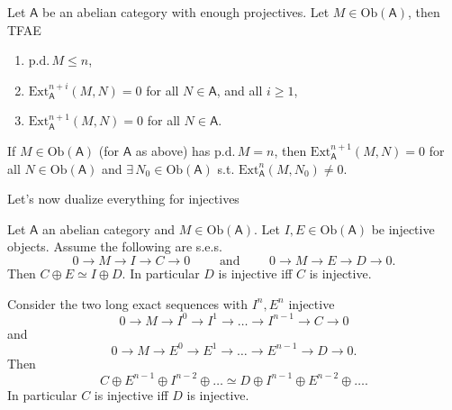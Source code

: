 \begin{prop}
	Let $\mathsf{A}$ be an abelian category with enough projectives.
	Let $M \in \mathrm{Ob} \left(\mathsf{A}\right)$, then TFAE
	\begin{enumerate}
		\item $\mathrm{p.d.}\, M \leq n$,
		\item $\mathrm{Ext}^{n+i}_{\mathsf{A}} (M,N) = 0$ for all $N \in \mathsf{A}$, and all $i \geq 1$,
		\item $\mathrm{Ext}^{n+1}_{\mathsf{A}} (M,N) = 0$ for all $N \in \mathsf{A}$.
	\end{enumerate}
\end{prop} 
\begin{cor}
	If $M \in \mathrm{Ob} \left(\mathsf{A}\right)$ (for $\mathsf{A}$ as above) 
	has $\mathrm{p.d.}\, M = n$, then
	$\mathrm{Ext}^{n+1}_{\mathsf{A}}(M,N) = 0$ for all $N \in \mathrm{Ob} \left(\mathsf{A}\right)$
	and $\exists\, N_0 \in \mathrm{Ob} \left(\mathsf{A}\right)$ s.t.
	$\mathrm{Ext}^n_{\mathsf{A}}(M,N_0) \neq 0$.
\end{cor} 
Let's now dualize everything for injectives
\begin{lem}
	Let $\mathsf{A}$ an abelian category and $M \in \mathrm{Ob} \left(\mathsf{A}\right)$.
	Let $I, E \in \mathrm{Ob} \left(\mathsf{A}\right)$ be injective objects.
	Assume the following are s.e.s.
	\begin{equation}
	0 \to M \to I \to C \to 0
	\qquad \text{ and } \qquad
	0 \to M \to E \to D \to 0
	.\end{equation} 
	Then $C \oplus E \simeq I \oplus D$.
	In particular $D$ is injective iff $C$ is injective.
\end{lem} 

\begin{cor}
	Consider the two long exact sequences with $I^n, E^n$ injective
	\begin{equation}
	0 \to M \to I^0 \to I^1 \to \ldots \to I^{n-1} \to C \to 0
	\end{equation} 
	and
	\begin{equation}
	0 \to M \to E^0 \to E^1 \to \ldots \to E^{n-1} \to D \to 0
	.\end{equation} 
	Then 
	\begin{equation}
	C \oplus E^{n-1} \oplus I^{n-2} \oplus \ldots \simeq
	D \oplus I^{n-1} \oplus E^{n-2} \oplus \ldots
	.\end{equation} 
	In particular $C$ is injective iff $D$ is injective.
\end{cor} 

